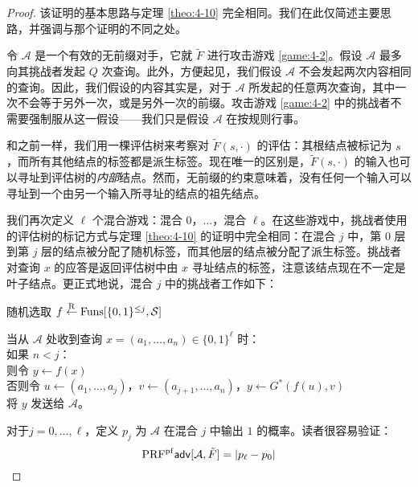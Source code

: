 \begin{proof}
该证明的基本思路与定理 \ref{theo:4-10} 完全相同。我们在此仅简述主要思路，并强调与那个证明的不同之处。

令 $\mathcal{A}$ 是一个有效的无前缀对手，它就 $\tilde F$ 进行攻击游戏 \ref{game:4-2}。假设 $\mathcal{A}$ 最多向其挑战者发起 $Q$ 次查询。此外，方便起见，我们假设 $\mathcal{A}$ 不会发起两次内容相同的查询。因此，我们假设的内容其实是，对于 $\mathcal{A}$ 所发起的任意两次查询，其中一次不会等于另外一次，或是另外一次的前缀。攻击游戏 \ref{game:4-2} 中的挑战者不需要强制服从这一假设——我们只是假设 $\mathcal{A}$ 在按规则行事。

和之前一样，我们用一棵评估树来考察对 $\tilde F(s,\cdot)$ 的评估：其根结点被标记为 $s$，而所有其他结点的标签都是派生标签。现在唯一的区别是，$\tilde F(s,\cdot)$ 的输入也可以寻址到评估树的\emph{内部}结点。然而，无前缀的约束意味着，没有任何一个输入可以寻址到一个由另一个输入所寻址的结点的祖先结点。

我们再次定义 $\ell$ 个混合游戏：混合 $0$，$\dots$，混合 $\ell$。在这些游戏中，挑战者使用的评估树的标记方式与定理 \ref{theo:4-10} 的证明中完全相同：在混合 $j$ 中，第 $0$ 层到第 $j$ 层的结点被分配了随机标签，而其他层的结点被分配了派生标签。挑战者对查询 $x$ 的应答是返回评估树中由 $x$ 寻址结点的标签，注意该结点现在不一定是叶子结点。更正式地说，混合 $j$ 中的挑战者工作如下：

\vspace{10pt}

\hspace*{5pt} 随机选取 $f\overset{\rm R}\leftarrow{\rm Funs}[\{0,1\}^{\leq j},\mathcal{S}]$

\vspace{5pt}

\hspace*{5pt} 当从 $\mathcal{A}$ 处收到查询 $x=(a_1,\dots,a_n)\in\{0,1\}^\ell$ 时：\\
\hspace*{50pt} 如果 $n<j$：\\
\hspace*{75pt} 则令 $y\leftarrow f(x)$\\
\hspace*{75pt} 否则令 $u\leftarrow(a_1,\dots,a_j)$，$v\leftarrow(a_{j+1},\dots,a_n)$，$y\leftarrow G^*(f(u),v)$\\
\hspace*{50pt} 将 $y$ 发送给 $\mathcal{A}$。

\vspace{10pt}

\noindent
对于$j=0,\dots,\ell$，定义 $p_j$ 为 $\mathcal{A}$ 在混合 $j$ 中输出 $1$ 的概率。读者很容易验证：
\[
{\rm PRF^{pf}\mathsf{adv}}[\mathcal{A},\tilde{F}]=|p_\ell-p_0|
\]


\end{proof}
